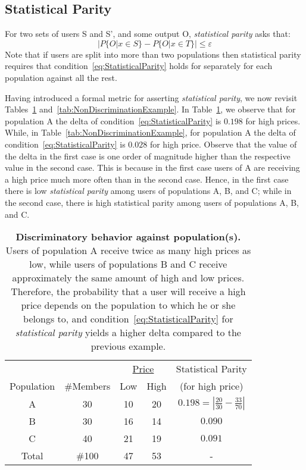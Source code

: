 \subsection{Statistical Parity}
\label{sect:statparity}

For two sets of users S and S', and some output O, {\em statistical parity}
asks that:
\begin{equation}
|P\{O | x \in S\} - P\{O | x \in T\}| \le \varepsilon
\label{eq:StatisticalParity}
\end{equation}
Note that if users are split into more than two populations then statistical
parity requires that condition~\ref{eq:StatisticalParity} holds for separately
for each population against all the rest.

Having introduced a formal metric for asserting {\em statistical parity}, we now
revisit Tables~\ref{tab:DiscriminationExample}
and~\ref{tab:NonDiscriminationExample}.
In Table~\ref{tab:DiscriminationExample}, we observe that for population A the
delta of condition~\ref{eq:StatisticalParity} is $0.198$ for high prices.
While, in Table~\ref{tab:NonDiscriminationExample}, for population A the delta
of condition~\ref{eq:StatisticalParity} is $0.028$ for high price. Observe that
the value of the delta in the first case is one order of magnitude higher than
the respective value in the second case. This is because in the first case
users of A are receiving a high price much more often than in the second case.
Hence, in the first case there is low {\em statistical parity} among users of
populations A, B, and C; while in the second case, there is high statistical
parity among users of populations A, B, and C.

\begin{table}[t]
{
 \scriptsize
  \renewcommand{\arraystretch}{1.5}
  \begin{tabular}{ c | c | c  c | c }
    & & \multicolumn{2}{|c|}{\underline{Price}} &  Statistical Parity\\
    Population & \#Members & Low & High & (for high price) \\
    \hline
    A & 30 &  10 & 20 & $0.198 = | \frac{20}{30} - \frac{33}{70}|$ \\
    B & 30 &  16 & 14 & $0.090$ \\
    C & 40 &  21 & 19 & $0.091$ \\
    \hline
    Total & \#100 & 47 & 53 & - \\
  \end{tabular}
  \caption{{\bf Discriminatory behavior against population(s).} Users of
    population A receive twice as many high prices as low, while users of
    populations B and C receive approximately the same amount of high and low
    prices. Therefore, the probability that a user will receive a high price
    depends on the population to which he or she belongs to, and
    condition~\ref{eq:StatisticalParity} for {\em statistical parity} yields a
    higher delta compared to the previous example.
  }
  \label{tab:DiscriminationExample}
}
\end{table}


